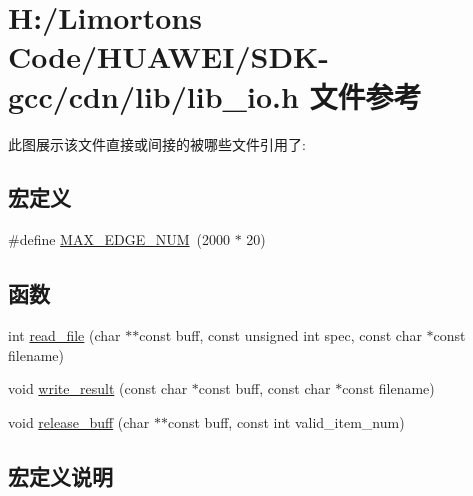 \hypertarget{_s_d_k-gcc_2cdn_2lib_2lib__io_8h}{}\section{H\+:/\+Limorton\textquotesingle{}s Code/\+H\+U\+A\+W\+E\+I/\+S\+D\+K-\/gcc/cdn/lib/lib\+\_\+io.h 文件参考}
\label{_s_d_k-gcc_2cdn_2lib_2lib__io_8h}
此图展示该文件直接或间接的被哪些文件引用了\+:
\subsection*{宏定义}
\begin{DoxyCompactItemize}
\item 
\#define \hyperlink{_s_d_k-gcc_2cdn_2lib_2lib__io_8h_a5e17bfd66025e3f6293a10a5b507b3f6}{M\+A\+X\+\_\+\+E\+D\+G\+E\+\_\+\+N\+UM}~(2000 $\ast$ 20)
\end{DoxyCompactItemize}
\subsection*{函数}
\begin{DoxyCompactItemize}
\item 
int \hyperlink{_s_d_k-gcc_2cdn_2lib_2lib__io_8h_a708ad21ddaefbe61c2eb2ccfa830fc27}{read\+\_\+file} (char $\ast$$\ast$const buff, const unsigned int spec, const char $\ast$const filename)
\item 
void \hyperlink{_s_d_k-gcc_2cdn_2lib_2lib__io_8h_a25431423c5cb8a43c0119c62e4e120cb}{write\+\_\+result} (const char $\ast$const buff, const char $\ast$const filename)
\item 
void \hyperlink{_s_d_k-gcc_2cdn_2lib_2lib__io_8h_adc4a454a96742f1b3dae623d8ed4c288}{release\+\_\+buff} (char $\ast$$\ast$const buff, const int valid\+\_\+item\+\_\+num)
\end{DoxyCompactItemize}


\subsection{宏定义说明}
\mbox{\label{_s_d_k-gcc_2cdn_2lib_2lib__io_8h_a5e17bfd66025e3f6293a10a5b507b3f6}} 
